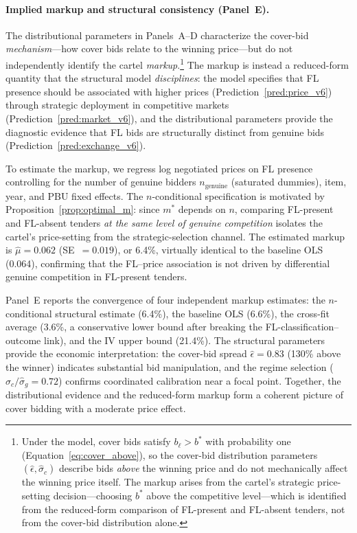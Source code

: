 \paragraph{Implied markup and structural consistency (Panel~E).} %
The distributional parameters in Panels~A--D characterize the
cover-bid \emph{mechanism}---how cover bids relate to the winning
price---but do not independently identify the cartel
\emph{markup}.\footnote{Under the model, cover bids satisfy
$b_\ell > b^*$ with probability one (Equation~\ref{eq:cover_above}),
so the cover-bid distribution parameters $(\hat{\epsilon},
\hat{\sigma}_c)$ describe bids \emph{above} the winning price and
do not mechanically affect the winning price itself. The markup
arises from the cartel's strategic price-setting decision---choosing
$b^*$ above the competitive level---which is identified from the
reduced-form comparison of FL-present and FL-absent tenders, not
from the cover-bid distribution alone.}
The markup is instead a reduced-form quantity that the structural
model \emph{disciplines}: the model specifies that FL presence should
be associated with higher prices
(Prediction~\ref{pred:price_v6}) through strategic deployment in
competitive markets (Prediction~\ref{pred:market_v6}), and the
distributional parameters provide the diagnostic evidence that FL
bids are structurally distinct from genuine bids
(Prediction~\ref{pred:exchange_v6}).

To estimate the markup, we regress log negotiated prices on FL
presence controlling for the number of genuine bidders
$n_{\text{genuine}}$ (saturated dummies), item, year, and PBU fixed
effects. The $n$-conditional specification is motivated by
Proposition~\ref{prop:optimal_m}: since $m^*$ depends on $n$,
comparing FL-present and FL-absent tenders \emph{at the same level of
genuine competition} isolates the cartel's price-setting from the
strategic-selection channel. The estimated markup is $\hat{\mu} =
0.062$ (SE~$= 0.019$), or 6.4\%, virtually identical to the baseline
OLS (0.064), confirming that the FL--price association is not driven
by differential genuine competition in FL-present tenders.

Panel~E reports the convergence of four independent markup estimates:
the $n$-conditional structural estimate (6.4\%), the baseline OLS
(6.6\%), the cross-fit average (3.6\%, a conservative lower bound
after breaking the FL-classification--outcome link), and the IV upper
bound (21.4\%). The structural parameters provide the economic
interpretation: the cover-bid spread $\hat{\epsilon} = 0.83$
(130\% above the winner) indicates substantial bid manipulation, and
the regime selection ($\hat{\sigma}_c / \hat{\sigma}_g = 0.72$)
confirms coordinated calibration near a focal point. Together, the
distributional evidence and the reduced-form markup form a coherent
picture of cover bidding with a moderate price effect.

